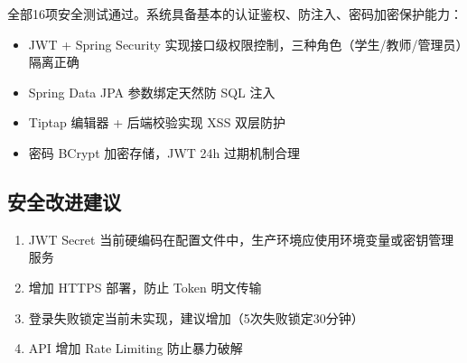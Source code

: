 全部16项安全测试通过。系统具备基本的认证鉴权、防注入、密码加密保护能力：
\begin{itemize}
    \item JWT + Spring Security 实现接口级权限控制，三种角色（学生/教师/管理员）隔离正确
    \item Spring Data JPA 参数绑定天然防 SQL 注入
    \item Tiptap 编辑器 + 后端校验实现 XSS 双层防护
    \item 密码 BCrypt 加密存储，JWT 24h 过期机制合理
\end{itemize}

\subsection{安全改进建议}

\begin{enumerate}
    \item JWT Secret 当前硬编码在配置文件中，生产环境应使用环境变量或密钥管理服务
    \item 增加 HTTPS 部署，防止 Token 明文传输
    \item 登录失败锁定当前未实现，建议增加（5次失败锁定30分钟）
    \item API 增加 Rate Limiting 防止暴力破解
\end{enumerate}
